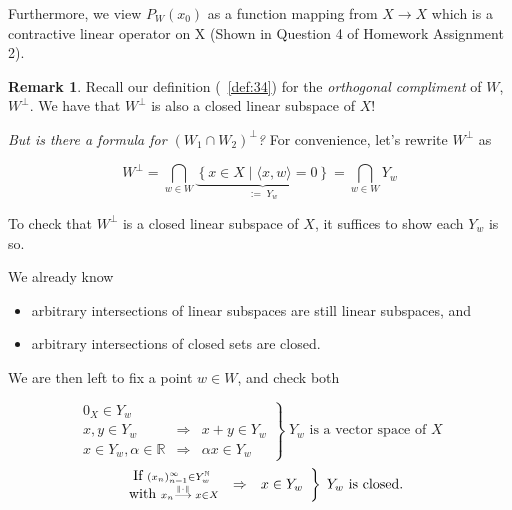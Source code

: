 \documentclass[11pt]{amsart}
\theoremstyle{definition}
\newtheorem{remark}[theorem]{Remark}
\numberwithin{equation}{section}
\newcommand{\bN}{ \mathbb{N} }	%
\newcommand{\bR}{ \mathbb{R} }	%
\newcommand{\proj}{ P_W(x_0) } 							%
\begin{document}
\vspace{6pt}

Furthermore, we view $\proj$ as a function mapping from $X \rightarrow X$ which is a contractive linear operator on X (Shown in Question 4 of Homework Assignment 2). 

\vspace{6pt}

\begin{remark}\label{rem:36}
Recall our definition (~\ref{def:34}) for the \textit{orthogonal compliment} of $W$, $W^\perp$. We have that $W^\perp$ is also a closed linear subspace of $X$!

\vspace{6pt}

\textit{But is there a formula for $(W_1 \cap W_2)^\perp$?} For convenience, let's rewrite $W^\perp$ as 

\[ W^\perp = \bigcap_{w \in W} \underbrace{\left\{ x \in X \; | \; \langle x,w \rangle = 0 \right\}}_{:= \; Y_w} = \bigcap_{w \in W}Y_w\]

\noindent To check that $W^\perp$ is a closed linear subspace of $X$, it suffices to show each $Y_w$ is so.

We already know
\begin{itemize}[nosep, label= $\rightarrow$]
\item arbitrary intersections of linear subspaces are still linear subspaces, and
\item arbitrary intersections of closed sets are closed.
\end{itemize}

\noindent We are then left to fix a point $w \in W$, and check both

\[
\left.
\begin{array}{clc}
  0_X \in Y_w & &     \\
x,y \in Y_w & \Rightarrow & x + y \in Y_w \\
x \in Y_w, \alpha \in \bR & \Rightarrow & \alpha x \in Y_w 
\end{array}
\right\}
\; Y_w \mbox{ is a vector space of } X
\]
\vspace{6pt}
\[
\left.
\begin{array}{clc}
\begin{subarray}{c}
\mbox{If } (x_n)^\infty_{n=1} \in Y_w^\bN \\
\mbox{ with } x_n \overset{\| \cdot \|} \longrightarrow \; x \in X
\end{subarray}
 & \Rightarrow & x \in Y_w 
\end{array}
\right\}
\; Y_w \mbox{ is closed.}
\]
\end{remark}
\end{document}

